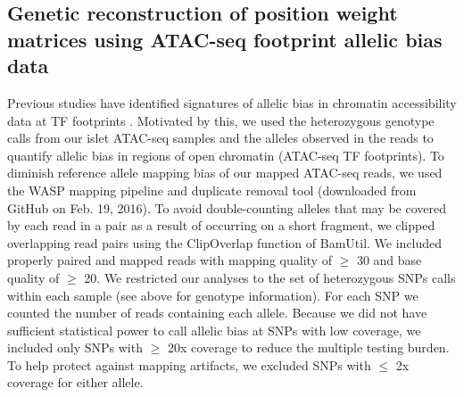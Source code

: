 \subsection{Genetic reconstruction of position weight matrices using ATAC-seq footprint allelic bias data}
Previous studies have identified signatures of allelic bias in chromatin accessibility data at TF footprints \cite{mauranoLargescaleIdentificationSequence2015, moyerbraileanWhichGeneticsVariants2016}. Motivated by this, we used the heterozygous genotype calls from our islet ATAC-seq samples and the alleles observed in the reads to quantify allelic bias in regions of open chromatin (ATAC-seq TF footprints). To diminish reference allele mapping bias of our mapped ATAC-seq reads, we used the WASP mapping pipeline and duplicate removal tool \cite{geijnWASPAllelespecificSoftware2015} (downloaded from GitHub on Feb. 19, 2016). To avoid double-counting alleles that may be covered by each read in a pair as a result of occurring on a short fragment, we clipped overlapping read pairs using the ClipOverlap function of BamUtil. We included properly paired and mapped reads with mapping quality of $\geq$ 30 and base quality of $\geq$ 20. We restricted our analyses to the set of heterozygous SNPs calls within each sample (see above for genotype information). For each SNP we counted the number of reads containing each allele.  Because we did not have sufficient statistical power to call allelic bias at SNPs with low coverage, we included only SNPs with $\geq$ 20x coverage to reduce the multiple testing burden.  To help protect against mapping artifacts, we excluded SNPs with $\leq$ 2x coverage for either allele. 

